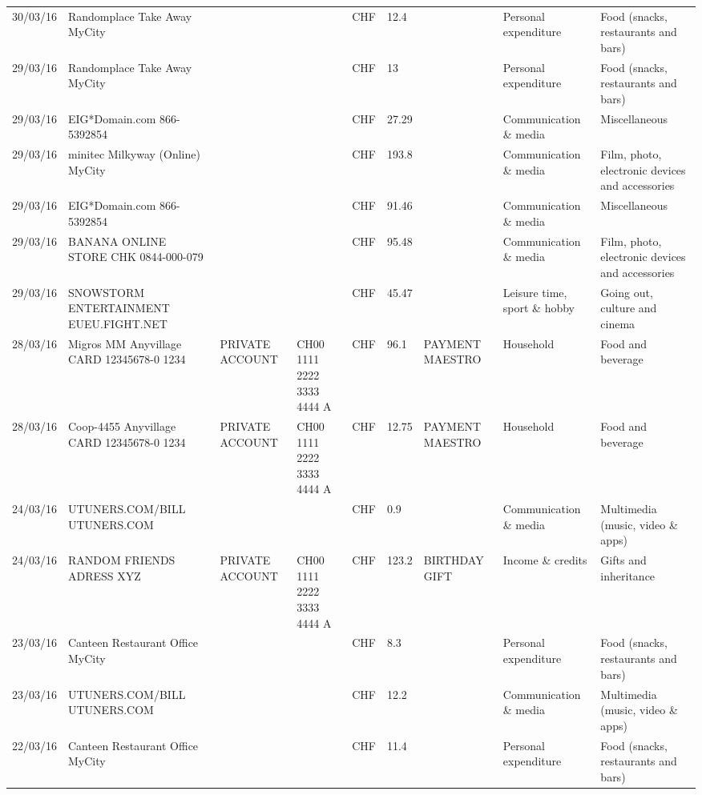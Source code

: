 \begin{landscape}
\begin{adjustwidth}{-2cm}{-2cm}
\begin{tiny}
\begin{longtable}{lp{4cm}llllp{3cm}ll}
		30/03/16 & Randomplace Take Away     MyCity &       &       & CHF   & 12.4  &       & Personal expenditure & Food (snacks, restaurants and bars) \\
		29/03/16 & Randomplace Take Away     MyCity &       &       & CHF   & 13    &       & Personal expenditure & Food (snacks, restaurants and bars) \\
		29/03/16 & EIG*Domain.com           866-5392854 &       &       & CHF   & 27.29 &       & Communication \& media & Miscellaneous \\
		29/03/16 & minitec Milkyway (Online) MyCity &       &       & CHF   & 193.8 &       & Communication \& media & Film, photo, electronic devices and accessories \\
		29/03/16 & EIG*Domain.com           866-5392854 &       &       & CHF   & 91.46 &       & Communication \& media & Miscellaneous \\
		29/03/16 & BANANA ONLINE STORE CHK   0844-000-079 &       &       & CHF   & 95.48 &       & Communication \& media & Film, photo, electronic devices and accessories \\
		29/03/16 & SNOWSTORM ENTERTAINMENT EUEU.FIGHT.NET &       &       & CHF   & 45.47 &       & Leisure time, sport \& hobby & Going out, culture and cinema \\
		28/03/16 & Migros MM Anyvillage CARD 12345678-0 1234 & PRIVATE ACCOUNT & CH00 1111 2222 3333 4444 A & CHF   & 96.1  & PAYMENT MAESTRO & Household & Food and beverage \\
		28/03/16 & Coop-4455 Anyvillage CARD 12345678-0 1234 & PRIVATE ACCOUNT & CH00 1111 2222 3333 4444 A & CHF   & 12.75 & PAYMENT MAESTRO & Household & Food and beverage \\
		24/03/16 & UTUNERS.COM/BILL          UTUNERS.COM &       &       & CHF   & 0.9   &       & Communication \& media & Multimedia (music, video \& apps) \\
		24/03/16 & RANDOM FRIENDS ADRESS XYZ & PRIVATE ACCOUNT & CH00 1111 2222 3333 4444 A & CHF   & 123.2 & BIRTHDAY GIFT & Income \& credits & Gifts and inheritance \\
		23/03/16 & Canteen Restaurant Office      MyCity &       &       & CHF   & 8.3   &       & Personal expenditure & Food (snacks, restaurants and bars) \\
		23/03/16 & UTUNERS.COM/BILL          UTUNERS.COM &       &       & CHF   & 12.2  &       & Communication \& media & Multimedia (music, video \& apps) \\
		22/03/16 & Canteen Restaurant Office      MyCity &       &       & CHF   & 11.4  &       & Personal expenditure & Food (snacks, restaurants and bars) \\

\end{longtable}
\end{tiny}
\end{adjustwidth}
\end{landscape}
